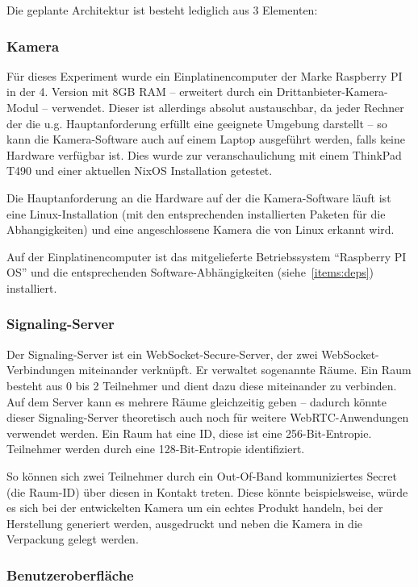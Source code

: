 \documentclass{article}
\begin{document}
\begin{onecolumn}
Die geplante Architektur ist besteht lediglich aus 3 Elementen:

\subsubsection{Kamera}

Für dieses Experiment wurde ein Einplatinencomputer der Marke Raspberry PI in
der 4. Version mit 8GB RAM – erweitert durch ein Drittanbieter-Kamera-Modul –
verwendet. Dieser ist allerdings absolut austauschbar, da jeder Rechner der
die u.g. Hauptanforderung erfüllt eine geeignete Umgebung darstellt – so kann
die Kamera-Software auch auf einem Laptop ausgeführt werden, falls keine
Hardware verfügbar ist. Dies wurde zur veranschaulichung mit einem ThinkPad
T490 und einer aktuellen NixOS Installation getestet.

Die Hauptanforderung an die Hardware auf der die Kamera-Software läuft ist eine
Linux-Installation (mit den entsprechenden installierten Paketen für die
Abhangigkeiten) und eine angeschlossene Kamera die von Linux erkannt wird.

Auf der Einplatinencomputer ist das mitgelieferte Betriebssystem ``Raspberry PI
OS'' und die entsprechenden Software-Abhängigkeiten (siehe~\ref{items:deps})
installiert.

\subsubsection{Signaling-Server}

Der Signaling-Server ist ein WebSocket-Secure-Server, der zwei
WebSocket-Verbindungen miteinander verknüpft. Er verwaltet sogenannte Räume.
Ein Raum besteht aus 0 bis 2 Teilnehmer und dient dazu diese miteinander zu
verbinden. Auf dem Server kann es mehrere Räume gleichzeitig geben – dadurch
könnte dieser Signaling-Server theoretisch auch noch für weitere
WebRTC-Anwendungen verwendet werden. Ein Raum hat eine ID, diese ist eine
256-Bit-Entropie. Teilnehmer werden durch eine 128-Bit-Entropie identifiziert.

So können sich zwei Teilnehmer durch ein Out-Of-Band kommuniziertes Secret (die
Raum-ID) über diesen in Kontakt treten. Diese könnte beispielsweise, würde es
sich bei der entwickelten Kamera um ein echtes Produkt handeln, bei der
Herstellung generiert werden, ausgedruckt und neben die Kamera in die
Verpackung gelegt werden.

\subsubsection{Benutzeroberfläche}


\end{onecolumn}
\end{document}
